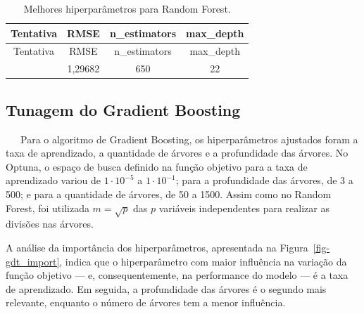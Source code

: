 \documentclass[
  12pt,
  a4paper,
]{scrreprt}
\begin{document}
\begin{longtable}[]{@{}cccc@{}}
\caption{Melhores hiperparâmetros para Random
Forest.}\label{tbl-params_rf}\tabularnewline
\toprule\noalign{}
Tentativa & RMSE & n\_estimators & max\_depth \\
\midrule\noalign{}
\endfirsthead
\toprule\noalign{}
Tentativa & RMSE & n\_estimators & max\_depth \\
\midrule\noalign{}
\endhead
\bottomrule\noalign{}
\endlastfoot
67 & 1,29682 & 650 & 22 \\
\end{longtable}

\subsection{Tunagem do Gradient
Boosting}\label{tunagem-do-gradient-boosting}

~~~Para o algoritmo de Gradient Boosting, os hiperparâmetros ajustados
foram a taxa de aprendizado, a quantidade de árvores e a profundidade
das árvores. No Optuna, o espaço de busca definido na função objetivo
para a taxa de aprendizado variou de \(1 \cdot 10^{-5}\) a
\(1 \cdot 10^{-1}\); para a profundidade das árvores, de 3 a 500; e para
a quantidade de árvores, de 50 a 1500. Assim como no Random Forest, foi
utilizada \(m = \sqrt{p}\)\hspace{0pt} das \(p\) variáveis independentes
para realizar as divisões nas árvores.

\vspace{12pt}

A análise da importância dos hiperparâmetros, apresentada na
Figura~\ref{fig-gdt_import}, indica que o hiperparâmetro com maior
influência na variação da função objetivo --- e, consequentemente, na
performance do modelo --- é a taxa de aprendizado. Em seguida, a
profundidade das árvores é o segundo mais relevante, enquanto o número
de árvores tem a menor influência.
\end{document}
